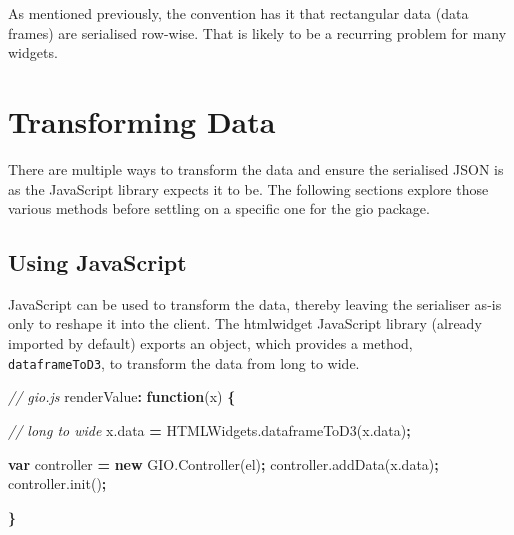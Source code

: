 \documentclass[10pt,]{krantz}
\makeatletter
\newenvironment{Shaded}{\begin{snugshade}}{\end{snugshade}}
\newcommand{\AttributeTok}[1]{\textcolor[rgb]{0.61,0.61,0.61}{#1}}
\newcommand{\CommentTok}[1]{\textcolor[rgb]{0.37,0.37,0.37}{\textit{#1}}}
\newcommand{\KeywordTok}[1]{\textcolor[rgb]{0.27,0.27,0.27}{\textbf{#1}}}
\newcommand{\NormalTok}[1]{#1}
\newcommand{\OperatorTok}[1]{\textcolor[rgb]{0.43,0.43,0.43}{\textbf{#1}}}
\newcommand{\VariableTok}[1]{\textcolor[rgb]{0,0,0}{#1}}
\newenvironment{kframe}{%
\medskip{}
\setlength{\fboxsep}{.8em}
 \def\at@end@of@kframe{}%
 \ifinner\ifhmode%
  \def\at@end@of@kframe{\end{minipage}}%
  \begin{minipage}{\columnwidth}%
 \fi\fi%
 \def\FrameCommand##1{\hskip\@totalleftmargin \hskip-\fboxsep
 \colorbox{shadecolor}{##1}\hskip-\fboxsep
     \hskip-\linewidth \hskip-\@totalleftmargin \hskip\columnwidth}%
 \MakeFramed {\advance\hsize-\width
   \@totalleftmargin\z@ \linewidth\hsize
   \@setminipage}}%
 {\par\unskip\endMakeFramed%
 \at@end@of@kframe}
\renewenvironment{Shaded}{\begin{kframe}}{\end{kframe}}
\makeatother
\begin{document}
As mentioned previously, the convention has it that rectangular data (data frames) are serialised row-wise. That is likely to be a recurring problem for many widgets.

\hypertarget{widgets-full-transform-data}{%
\section{Transforming Data}\label{widgets-full-transform-data}}

There are multiple ways to transform the data and ensure the serialised JSON is as the JavaScript library expects it to be. The following sections explore those various methods before settling on a specific one for the gio package.

\hypertarget{widgets-full-transform-data-js}{%
\subsection{Using JavaScript}\label{widgets-full-transform-data-js}}

JavaScript can be used to transform the data, thereby leaving the serialiser as-is only to reshape it into the client. The htmlwidget JavaScript library (already imported by default) exports an object, which provides a method, \texttt{dataframeToD3}, to transform the data from long to wide.

\begin{Shaded}
\begin{Highlighting}[]
\CommentTok{// gio.js}
\NormalTok{renderValue}\OperatorTok{:} \KeywordTok{function}\NormalTok{(x) }\OperatorTok{\{}

  \CommentTok{// long to wide}
  \VariableTok{x}\NormalTok{.}\AttributeTok{data} \OperatorTok{=} \VariableTok{HTMLWidgets}\NormalTok{.}\AttributeTok{dataframeToD3}\NormalTok{(}\VariableTok{x}\NormalTok{.}\AttributeTok{data}\NormalTok{)}\OperatorTok{;}

  \KeywordTok{var}\NormalTok{ controller }\OperatorTok{=} \KeywordTok{new} \VariableTok{GIO}\NormalTok{.}\AttributeTok{Controller}\NormalTok{(el)}\OperatorTok{;}
  \VariableTok{controller}\NormalTok{.}\AttributeTok{addData}\NormalTok{(}\VariableTok{x}\NormalTok{.}\AttributeTok{data}\NormalTok{)}\OperatorTok{;} 
  \VariableTok{controller}\NormalTok{.}\AttributeTok{init}\NormalTok{()}\OperatorTok{;}

\OperatorTok{\}}
\end{Highlighting}
\end{Shaded}
\end{document}

